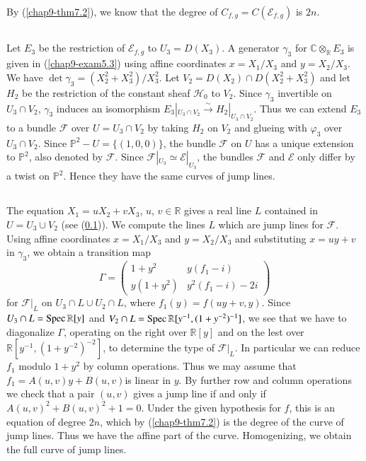 By (\ref{chap9-thm7.2}), we know that the degree of
$C_{f,g}=C(\mathscr{E}_{f,g})$ is $2n$.

\subsection{}\label{chap9-sec8.2}\pageoriginale
Let $E_{3}$ be the restriction of $\mathscr{E}_{f,g}$ to
$U_{3}=D(X_{3})$. A generator $\gamma_{3}$ for
$\mathbb{C}\otimes_{\mathbb{R}}E_{3}$ is given in
(\ref{chap9-exam5.3}) using affine coordinates $x=X_{1}/X_{3}$ and
$y=X_{2}/X_{3}$. We have
$\det \gamma_{3}=(X^{2}_{2}+X^{2}_{3})/X^{2}_{3}$. Let
$V_{2}=D(X_{2})\cap D(X^{2}_{2}+X^{2}_{3})$ and let $H_{2}$ be the
restriction of the constant sheaf $\mathscr{H}_{0}$ to $V_{2}$. Since
$\gamma_{3}$ invertible on $U_{3}\cap V_{2}$, $\gamma_{3}$ induces an
isomorphism $E_{3}|_{U_{3}\cap
V_{2}}\xrightarrow{\sim}H_{2}|_{U_{3}\cap V_{2}}$. Thus we can extend
$E_{3}$ to a bundle $\mathscr{F}$ over $U=U_{3}\cap V_{2}$ by taking
$H_{2}$ on $V_{2}$ and glueing with $\varphi_{3}$ over $U_{3}\cap
V_{2}$. Since $\mathbb{P}^{2}-U=\{(1,0,0)\}$, the bundle $\mathscr{F}$
on $U$ has a unique extension to $\mathbb{P}^{2}$, also denoted by
$\mathscr{F}$. Since
$\mathscr{F}|_{U_{3}}\simeq \mathscr{E}|_{U_{3}}$, the bundles
$\mathscr{F}$ and $\mathscr{E}$ only differ by a twist on
$\mathbb{P}^{2}$. Hence they have the same curves of jump lines.

\subsection{}\label{chap9-sec8.3}
The equation $X_{1}=uX_{2}+vX_{3}$, $u$, $v\in \mathbb{R}$ gives a
real line $L$ contained in $U=U_{3}\cup V_{2}$ (see
(\ref{chap9-sec8.2})). We compute the lines $L$ which are jump lines
for $\mathscr{F}$. Using affine coordinates $x=X_{1}/X_{3}$ and
$y=X_{2}/X_{3}$ and substituting $x=uy+v$ in $\gamma_{3}$, we obtain a
transition map
$$
\Gamma=
\begin{pmatrix}
1+y^{2} & y(f_{1}-i)\\
y(1+y^{2}) & y^{2}(f_{1}-i)-2i
\end{pmatrix}
$$
for $\mathscr{F}|_{L}$ on $U_{3}\cap L\cup U_{2}\cap L$, where
$f_{1}(y)=f(uy+v,y)$. Since $U_{3}\cap L=\operatorname{Spec} \mathbb{R}[y]$ and
$V_{2}\cap L=\operatorname{Spec} \mathbb{R}[y^{-1},(1+y^{-2})^{-1}]$, we see that we
have to diagonalize $\Gamma$, operating on the right over
$\mathbb{R}[y]$ and on the lest over
$\mathbb{R}[y^{-1},(1+y^{-2})^{-2}]$, to determine the type of
$\mathscr{F}|_{L}$. In particular we can reduce $f_{1}$ modulo
$1+y^{2}$ by column operations. Thus we may assume that
$f_{1}=A(u,v)y+B(u,v)$\pageoriginale is linear in $y$. By further row
and column operations we check that a pair $(u,v)$ gives a jump line
if and only if $A(u,v)^{2}+B(u,v)^{2}+1=0$. Under the given hypothesis
for $f$, this is an equation of degree $2n$, which by
(\ref{chap9-thm7.2}) is the degree of the curve of jump lines. Thus we
have the affine part of the curve. Homogenizing, we obtain the full
curve of jump lines. 

